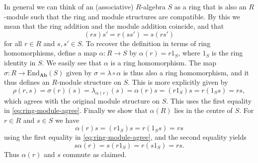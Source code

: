 \documentclass[article, a4paper, 11pt, oneside]{memoir}
\numberwithin{equation}{chapter}
\newcommand{\ncat}[1]{\mathbf{#1}} %
\newcommand{\catAb}{\ncat{Ab}} %
\newcommand{\End}{\mathrm{End}}
\theoremstyle{nonumberplain}
\begin{document}
\begin{remarkbreak}[$R$-algebras]
    In general we can think of an (associative) $R$-algebra $S$ as a ring that is also an $R$-module such that the ring and module structures are compatible. By this we mean that the ring addition and the module addition coincide, and that
    \begin{equation}
        \label{eq:ring-module-agree}
        (rs)s' = r(ss') = s(rs')
    \end{equation}
    for all $r \in R$ and $s,s' \in S$. To recover the definition in terms of ring homomorphisms, define a map $\alpha \colon R \to S$ by $\alpha(r) = r 1_S$, where $1_S$ is the ring identity in $S$. We easily see that $\alpha$ is a ring homomorphism. The map $\sigma \colon R \to \End_\catAb(S)$ given by $\sigma = \lambda \circ \alpha$ is thus also a ring homomorphism, and it thus defines an $R$-module structure on $S$. This is more explicitly given by
    \begin{equation*}
        \rho(r,s)
            = \sigma(r)(s)
            = \lambda_{\alpha(r)}(s)
            = \alpha(r)s
            = (r 1_S) s
            = r (1_S s)
            = rs,
    \end{equation*}
    which agrees with the original module structure on $S$. This uses the first equality in \cref{eq:ring-module-agree}. Finally we show that $\alpha(R)$ lies in the centre of $S$. For $r \in R$ and $s \in S$ we have
    \begin{equation*}
        \alpha(r)s
            = (r 1_S)s
            = r (1_S s)
            = rs
    \end{equation*}
    using the first equality in \cref{eq:ring-module-agree}, and the second equality yields
    \begin{equation*}
        s \alpha(r)
            = s (r 1_S)
            = r (s 1_S)
            = rs.
    \end{equation*}
    Thus $\alpha(r)$ and $s$ commute as claimed.
\end{remarkbreak}
\end{document}
